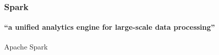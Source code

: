 \documentclass[aspectratio=169,usenames,dvipsnames]{beamer}
\begin{document}
    \begin{frame}
        \frametitle{Spark}
        \framesubtitle{``a unified analytics engine for large-scale data processing''}
        \begin{block}{Apache Spark}
        \begin{center}
        \end{center}
        \end{block}
    \end{frame}
\end{document}
